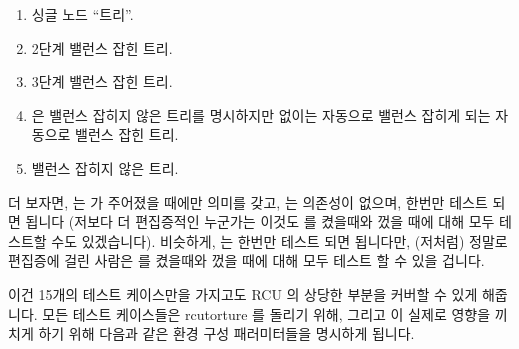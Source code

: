 \begin{enumerate}
\item	싱글 노드 ``트리''.
\item	2단계 밸런스 잡힌 트리.
\item	3단계 밸런스 잡힌 트리.
\item	{} 은 밸런스 잡히지 않은 트리를 명시하지만
	 없이는 자동으로 밸런스 잡히게 되는
	자동으로 밸런스 잡힌 트리.
\item	밸런스 잡히지 않은 트리.
\iffalse

\item	Single-node ``tree''.
\item	Two-level balanced tree.
\item	Three-level balanced tree.
\item	Autobalanced tree, where \co{CONFIG_RCU_FANOUT}
	specifies an unbalanced tree, but such that it is auto-balanced
	in absence of \co{CONFIG_RCU_FANOUT_EXACT}.
\item	Unbalanced tree.
\fi
\end{enumerate}

더 보자면,  는  가 주어졌을 때에만 의미를
갖고,  는 의존성이 없으며, 한번만 테스트 되면
됩니다 (저보다 더 편집증적인 누군가는 이것도  를 켰을때와 껐을
때에 대해 모두 테스트할 수도 있겠습니다).
비슷하게,  는 한번만 테스트 되면 됩니다만, (저처럼) 정말로
편집증에 걸린 사람은  를 켰을때와 껐을 때에 대해 모두 테스트
할 수 있을 겁니다.

이건 15개의 테스트 케이스만을 가지고도 RCU 의 상당한 부분을 커버할 수 있게
해줍니다.
모든 테스트 케이스들은 rcutorture 를 돌리기 위해, 그리고
 이 실제로 영향을 끼치게 하기 위해 다음과 같은 환경
구성 패러미터들을 명시하게 됩니다.
\iffalse

Looking further, \co{CONFIG_HOTPLUG_CPU} makes sense only
given \co{CONFIG_SMP}, and \co{CONFIG_RCU_CPU_STALL_DETECTOR}
is independent, and really only needs to be tested once (though someone
even more paranoid than am I might decide to test it both with
and without \co{CONFIG_SMP}).
Similarly, \co{CONFIG_RCU_TRACE} need only be tested once,
but the truly paranoid (such as myself) will choose to run it both with
and without \co{CONFIG_NO_HZ}.

This allows us to obtain excellent coverage of RCU with only 15
test cases.
All test cases specify the following configuration parameters in order
to run rcutorture and so that \co{CONFIG_HOTPLUG_CPU=n} actually
takes effect:
\fi

